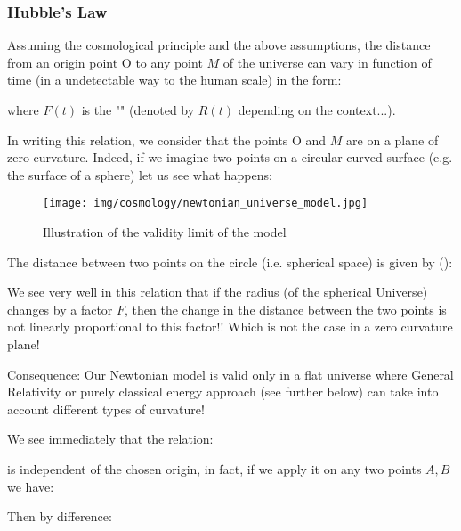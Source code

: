 	\subsubsection{Hubble's Law}
	Assuming the cosmological principle and the above assumptions, the distance from an origin point O to any point $M$ of the universe can vary in function of time (in a undetectable way to the human scale) in the form:
	
	where $F(t)$ is the "" (denoted by $R(t)$ depending on the context...).
	
	In writing this relation, we consider that the points O and $M$ are on a plane of zero curvature. Indeed, if we imagine two points on a circular curved surface (e.g. the surface of a sphere) let us see what happens:
	\begin{figure}[H]
		\begin{center}
		\texttt{[image: img/cosmology/newtonian\_universe\_model.jpg]}
		\end{center}	
		\caption{Illustration of the validity limit of the model}
	\end{figure}
	The distance between two points on the circle (i.e. spherical space) is given by ():
	
	We see very well in this relation that if the radius (of the spherical Universe) changes by a factor $F$, then the change in the distance between the two points is not linearly proportional to this factor!! Which is not the case in a zero curvature plane!
	
	Consequence: Our Newtonian model is valid only in a flat universe where General Relativity or purely classical energy approach (see further below) can take into account different types of curvature!
	
	We see immediately that the relation:
	
	is independent of the chosen origin, in fact, if we apply it on any two points $A, B$ we have:
	
	Then by difference:
	
